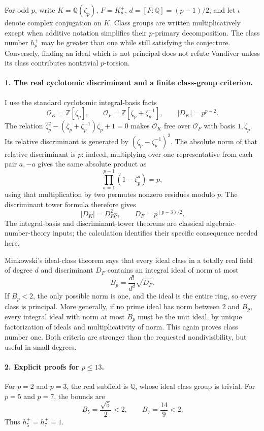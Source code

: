 \documentclass[11pt]{article}
\begin{document}
For odd $p$, write $K=\mathbb Q(\zeta_p)$, $F=K_p^+$, $d=[F:\mathbb Q]=(p-1)/2$, and let $\iota$ denote complex conjugation on $K$. Class groups are written multiplicatively except when additive notation simplifies their $p$-primary decomposition. The class number $h_p^+$ may be greater than one while still satisfying the conjecture. Conversely, finding an ideal which is not principal does not refute Vandiver unless its class contributes nontrivial $p$-torsion.

\paragraph{1. The real cyclotomic discriminant and a finite class-group criterion.}
I use the standard cyclotomic integral-basis facts
\[
 \mathcal O_K=\mathbb Z[\zeta_p],\qquad
 \mathcal O_F=\mathbb Z[\zeta_p+\zeta_p^{-1}],\qquad
 |D_K|=p^{p-2}.
\]
The relation $\zeta_p^2-(\zeta_p+\zeta_p^{-1})\zeta_p+1=0$ makes $\mathcal O_K$ free over $\mathcal O_F$ with basis $1,\zeta_p$. Its relative discriminant is generated by $(\zeta_p-\zeta_p^{-1})^2$. The absolute norm of that relative discriminant is $p$: indeed, multiplying over one representative from each pair $a,-a$ gives the same absolute product as
\[
 \prod_{a=1}^{p-1}(1-\zeta_p^a)=p,
\]
using that multiplication by two permutes nonzero residues modulo $p$. The discriminant tower formula therefore gives
\[
 |D_K|=D_F^2p,\qquad D_F=p^{(p-3)/2}.
\]
The integral-basis and discriminant-tower theorems are classical algebraic-number-theory inputs; the calculation identifies their specific consequence needed here.

Minkowski's ideal-class theorem says that every ideal class in a totally real field of degree $d$ and discriminant $D_F$ contains an integral ideal of norm at most
\[
 B_p=\frac{d!}{d^d}\sqrt{D_F}.
\]
If $B_p<2$, the only possible norm is one, and the ideal is the entire ring, so every class is principal. More generally, if no prime ideal has norm between 2 and $B_p$, every integral ideal with norm at most $B_p$ must be the unit ideal, by unique factorization of ideals and multiplicativity of norm. This again proves class number one. Both criteria are stronger than the requested nondivisibility, but useful in small degrees.

\paragraph{2. Explicit proofs for $p\le13$.}
For $p=2$ and $p=3$, the real subfield is $\mathbb Q$, whose ideal class group is trivial. For $p=5$ and $p=7$, the bounds are
\[
 B_5=\frac{\sqrt5}{2}<2,
 \qquad B_7=\frac{14}{9}<2.
\]
Thus $h_5^+=h_7^+=1$.
\end{document}
